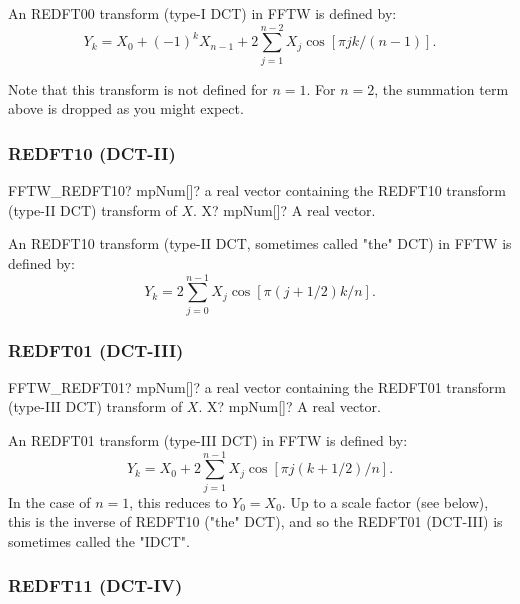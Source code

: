 \vspace{0.3cm}
An REDFT00 transform (type-I DCT) in FFTW is defined by:
\begin{equation}
Y_k = X_0 + (-1)^k X_{n-1} + 2 \sum^{n-2}_{j=1} X_j \cos[\pi jk/(n-1)].
\end{equation}

Note that this transform is not defined for $n = 1$. For $n = 2$, the summation term above is
dropped as you might expect.




\subsubsection{REDFT10 (DCT-II)}
\begin{mpFunctionsExtract}
	\mpFunctionOne
	{FFTW\_REDFT10? mpNum[]? a real vector containing the REDFT10 transform (type-II DCT) transform of $X$.}
	{X? mpNum[]? A real vector.}
\end{mpFunctionsExtract}

\vspace{0.3cm}
An REDFT10 transform (type-II DCT, sometimes called "the" DCT) in FFTW is defined by:
\begin{equation}
Y_k = 2 \sum^{n-1}_{j=0} X_j \cos[\pi (j+1/2)k/n].
\end{equation}




\subsubsection{REDFT01 (DCT-III)}
\begin{mpFunctionsExtract}
	\mpFunctionOne
	{FFTW\_REDFT01? mpNum[]? a real vector containing the REDFT01 transform (type-III DCT) transform of $X$.}
	{X? mpNum[]? A real vector.}
\end{mpFunctionsExtract}

\vspace{0.3cm}
An REDFT01 transform (type-III DCT) in FFTW is defined by:
\begin{equation}
Y_k = X_0 + 2 \sum^{n-1}_{j=1} X_j \cos[\pi j(k+1/2)/n].
\end{equation}
In the case of $n = 1$, this reduces to $Y_0 = X_0$. Up to a scale factor (see below), this is the inverse of REDFT10 ("the" DCT), and so the REDFT01 (DCT-III) is sometimes called the
"IDCT".




\subsubsection{REDFT11 (DCT-IV)}

